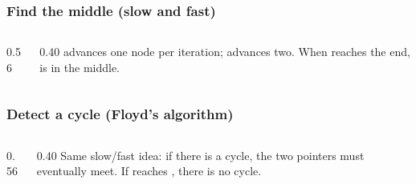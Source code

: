 \documentclass[aspectratio=169,10pt,compress]{beamer}
\begin{document}
\begin{frame}[t,fragile] \frametitle{Find the middle (slow and fast)}
  \begin{columns}[T]
    \begin{column}{0.56\textwidth}
    \end{column}
    \begin{column}{0.40\textwidth}
      \small
       advances one node per iteration; 
      advances two. When  reaches the end,  is
      in the middle.
    \end{column}
  \end{columns}
\end{frame}




\begin{frame}[t,fragile] \frametitle{Detect a cycle (Floyd's algorithm)}
  \begin{columns}[T]
    \begin{column}{0.56\textwidth}
    \end{column}
    \begin{column}{0.40\textwidth}
      \small
      Same slow/fast idea: if there is a cycle, the two pointers must
      eventually meet. If  reaches , there is
      no cycle.
    \end{column}
  \end{columns}
\end{frame}
\end{document}
